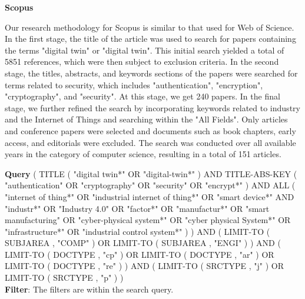 
\textbf{Scopus}

Our research methodology for Scopus is similar to that used for Web of Science. In the first stage, the title of the article was used to search for papers containing the terms "digital twin" or "digital twin". This initial search yielded a total of 5851 references, which were then subject to exclusion criteria. In the second stage, the titles, abstracts, and keywords sections of the papers were searched for terms related to security, which includes  "authentication", "encryption", "cryptography", and "security". At this stage, we get 240 papers. In the final stage,  we further refined the search by incorporating keywords related to industry and the Internet of Things and searching within the "All Fields". Only articles and conference papers were selected and documents such as book chapters, early access, and editorials were excluded. The search was conducted over all available years in the category of computer science, resulting in a total of 151 articles.

\begin{tcolorbox}[colback=black!5!white, sharp corners=all, colframe=white!95!black]
\textbf{Query}
\tcblower
( TITLE ( "digital twin*" OR "digital-twin*" ) AND TITLE-ABS-KEY ( "authentication" OR "cryptography" OR "security" OR "encrypt*" ) AND ALL ( "internet of thing*" OR "industrial internet of thing*" OR "smart device*" AND "industr*" OR "Industry 4.0" OR "factor*" OR "manufactur*" OR "smart manufacturing" OR "cyber-physical system*" OR "cyber physical System*" OR "infrastructure*" OR "industrial control system*" ) ) AND ( LIMIT-TO ( SUBJAREA , "COMP" ) OR LIMIT-TO ( SUBJAREA , "ENGI" ) ) AND ( LIMIT-TO ( DOCTYPE , "cp" ) OR LIMIT-TO ( DOCTYPE , "ar" ) OR LIMIT-TO ( DOCTYPE , "re" ) ) AND ( LIMIT-TO ( SRCTYPE , "j" ) OR LIMIT-TO ( SRCTYPE , "p" ) ) \\

\textbf{Filter}: The filters are within the search query.
\end{tcolorbox}


